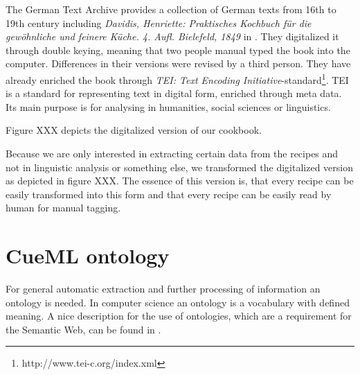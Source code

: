 \documentclass[12pt, twoside]{report}
\begin{document}
The German Text Archive provides a collection of German texts from 16th to 19th century including \textit{Davidis, Henriette: Praktisches Kochbuch für die gewöhnliche und feinere Küche. 4. Aufl. Bielefeld, 1849} in \parencite{DTA}. They digitalized it through double keying, meaning that two people manual typed the book into the computer. Differences in their versions were revised by a third person. They have already enriched the book through \textit{TEI: Text Encoding Initiative}-standard\footnote{http://www.tei-c.org/index.xml}. TEI is a standard for representing text in digital form, enriched through meta data. Its main purpose is for analysing in humanities, social sciences or linguistics.

Figure XXX depicts the digitalized version of our cookbook.

Because we are only interested in extracting certain data from the recipes and not in linguistic analysis or something else, we transformed the digitalized version as depicted in figure XXX. The essence of this version is, that every recipe can be easily transformed into this form and that every recipe can be easily read by human for manual tagging. 

\section{CueML ontology}
For general automatic extraction and further processing of information an ontology is needed. In computer science an ontology is a vocabulary with defined meaning. A nice description for the use of ontologies, which are a requirement for the Semantic Web, can be found in \parencite{semanticWeb}.
\end{document}
